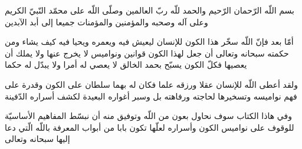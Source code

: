 بسم اللّه الرّحمان الرّحيم والحمد للّه ربّ العالمين وصلّى اللّه على محمّد النّبيّ الكريم وعلى آله وصحبه والمؤمنين والمؤمنات جميعا إلى أبد الآبدين

أمّا بعد فإنّ اللّه سخّر هذا الكون للإنسان ليعيش فيه ويعمره ويحيا فيه كيف يشاء ومن حكمته سبحانه وتعالى أن جعل لهذا الكون قوانين ونواميس لا يخرج عنها ولا يملك أن يعصيها فكلّ الكون يسبّح بحمد الخالق لا يعصي له أمرا ولا يبدّل له حكما

ولقد أعطى اللّه للإنسان عقلا ورزقه علما فكان له بهما سلطان على الكون وقدرة على فهم نواميسه وتسخيرها لحاجته ورفاهته بل وسبر أغواره البعيدة لكشف أسراره الدّفينة

وفي هاذا الكتاب سوف نحاول بعون من اللّه وتوفيق منه أن نبسّط المفاهيم الأساسيّة للوقوف على نواميس الكون وأسراره لعلّها تكون بابا من أبواب المعرفة باللّه الّتي دعا إليها سبحانه وتعالى

